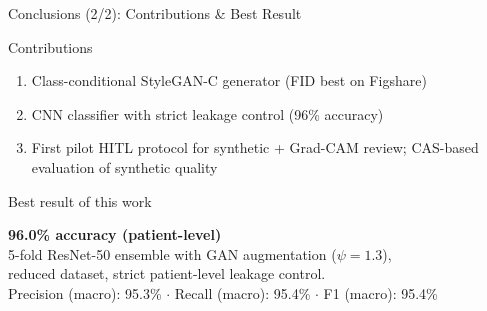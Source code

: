 \documentclass[aspectratio=169]{beamer}
\begin{document}
\begin{frame}{Conclusions (2/2): Contributions \& Best Result}
  \footnotesize
  {%
  \begin{block}{Contributions}
    \begin{enumerate}\itemsep2pt
      \item Class-conditional StyleGAN-C generator (FID best on Figshare)
      \item CNN classifier with strict leakage control (96\% accuracy)
      \item First pilot HITL protocol for synthetic + Grad-CAM review; CAS-based evaluation of synthetic quality
    \end{enumerate}
  \end{block}}

  \vspace{0.6em}
  \begin{block}{Best result of this work}
    \begin{center}
    \Large\textbf{96.0\% accuracy (patient-level)}\\[4pt]
    \normalsize
    5-fold ResNet-50 ensemble with GAN augmentation ($\psi=1.3$),\\
    reduced dataset, strict patient-level leakage control.\\[4pt]
    Precision (macro): 95.3\% $\cdot$ Recall (macro): 95.4\% $\cdot$ F1 (macro): 95.4\%
    \end{center}
  \end{block}
\end{frame}

\end{document}
